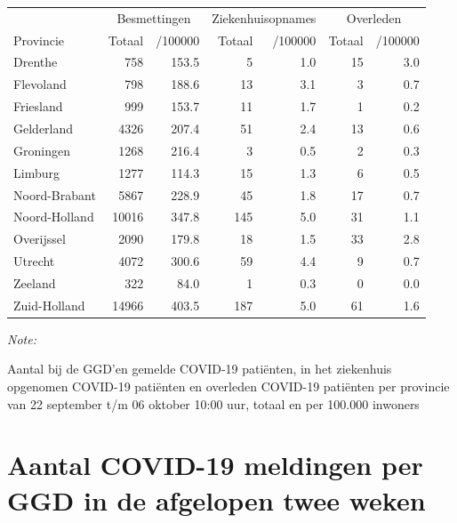 \documentclass[
  english,
  man,floatsintext]{apa6}
\begin{document}
\begin{table}[H]
\centering
\begin{threeparttable}
\begin{tabular}{lrrrrrr}
\toprule
\multicolumn{1}{c}{ } & \multicolumn{2}{c}{Besmettingen} & \multicolumn{2}{c}{Ziekenhuisopnames} & \multicolumn{2}{c}{Overleden} \\
\cmidrule(l{3pt}r{3pt}){2-3} \cmidrule(l{3pt}r{3pt}){4-5} \cmidrule(l{3pt}r{3pt}){6-7}
Provincie & Totaal & /100000 & Totaal & /100000 & Totaal & /100000\\
\midrule
Drenthe & 758 & 153.5 & 5 & 1.0 & 15 & 3.0\\
Flevoland & 798 & 188.6 & 13 & 3.1 & 3 & 0.7\\
Friesland & 999 & 153.7 & 11 & 1.7 & 1 & 0.2\\
Gelderland & 4326 & 207.4 & 51 & 2.4 & 13 & 0.6\\
Groningen & 1268 & 216.4 & 3 & 0.5 & 2 & 0.3\\
Limburg & 1277 & 114.3 & 15 & 1.3 & 6 & 0.5\\
Noord-Brabant & 5867 & 228.9 & 45 & 1.8 & 17 & 0.7\\
Noord-Holland & 10016 & 347.8 & 145 & 5.0 & 31 & 1.1\\
Overijssel & 2090 & 179.8 & 18 & 1.5 & 33 & 2.8\\
Utrecht & 4072 & 300.6 & 59 & 4.4 & 9 & 0.7\\
Zeeland & 322 & 84.0 & 1 & 0.3 & 0 & 0.0\\
Zuid-Holland & 14966 & 403.5 & 187 & 5.0 & 61 & 1.6\\
\bottomrule
\end{tabular}
\begin{tablenotes}
\item \textit{Note: } 
\item Aantal bij de GGD’en gemelde COVID-19 patiënten, in het ziekenhuis opgenomen COVID-19 patiënten en overleden COVID-19 patiënten per provincie van 22 september t/m 06 oktober 10:00 uur, totaal en per 100.000 inwoners
\end{tablenotes}
\end{threeparttable}
\end{table}

\newpage

\hypertarget{aantal-covid-19-meldingen-per-ggd-in-de-afgelopen-twee-weken}{%
\section{Aantal COVID-19 meldingen per GGD in de afgelopen twee weken}\label{aantal-covid-19-meldingen-per-ggd-in-de-afgelopen-twee-weken}}
\end{document}

